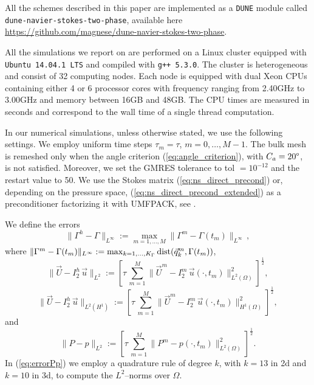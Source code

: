\documentclass[a4paper,12pt,onecolumn]{article}
\newcommand{\errorXx}{\|\Gamma^h - \Gamma\|_{L^\infty}}
\newcommand{\LerrorUu}[1]{\|\vec U - I^h_{#1}\,\vec u\|_{L^2}}
\newcommand{\HerrorUu}[1]{\|\vec U - I^h_{#1}\,\vec u\|_{L^2(H^1)}}
\newcommand{\LerrorPp}{\|P - p\|_{L^2}}
\newcommand{\myurl}[1]{\hfil\penalty 100 \hfilneg \hbox{\url{#1}}} %
\begin{document}
All the schemes described in this paper are implemented as a \verb|DUNE| module
called \verb|dune-navier-stokes-two-phase|, available here
\myurl{https://github.com/magnese/dune-navier-stokes-two-phase}.

All the simulations we report on are performed on a Linux cluster equipped with
\verb|Ubuntu 14.04.1 LTS| and compiled with \verb|g++ 5.3.0|. The cluster is
heterogeneous and consist of 32 computing nodes. Each node is equipped
with dual Xeon CPUs containing either 4 or 6 processor cores with frequency
ranging from 2.40GHz to 3.00GHz and memory between 16GB and 48GB. The CPU times
are measured in seconds and correspond to the wall time of a single thread
computation.

In our numerical simulations, unless otherwise stated, we use the following
settings. We employ uniform time steps $\tau_m=\tau$, $m=0,\ldots, M-1$. The
bulk mesh is remeshed only when the angle criterion (\ref{eq:angle_criterion}),
with $C_a=20\degree$, is not satisfied. Moreover, we set the GMRES
tolerance to tol $=10^{-12}$ and the restart value to 50. We use the Stokes
matrix (\ref{eq:ns_direct_precond}) or, depending on the pressure space,
(\ref{eq:ns_direct_precond_extended}) as a preconditioner factorizing it
with UMFPACK, see \cite{Davis04}.

We define the errors
\begin{equation} \label{eq:errorXx}
\errorXx := \max_{m=1,\ldots, M} \|\Gamma^m - \Gamma(t_m)\|_{L^\infty}\,,
\end{equation}
where $\|\Gamma^m - \Gamma(t_m)\|_{L^\infty} :=
\max_{k=1,\ldots, K_\Gamma} {\rm dist}( \vec q^m_k, \Gamma(t_m))$,
\begin{equation} \label{eq:errorLUu}
\LerrorUu2 := \left[\tau\,\sum_{m=1}^M \|\vec U^m - I^m_2\,\vec u(\cdot,
t_m)\|_{L^2(\Omega)}^2 \right]^\frac12,
\end{equation}
\begin{equation} \label{eq:errorHUu}
\HerrorUu2 := \left[\tau\,\sum_{m=1}^M \|\vec U^m - I^m_2\,\vec u(\cdot,
t_m)\|_{H^1(\Omega)}^2 \right]^\frac12,
\end{equation}
and
\begin{equation} \label{eq:errorPp}
\LerrorPp := \left[\tau\,\sum_{m=1}^M \|P^m - p(\cdot,t_m)\|_{L^2(\Omega)}^2
\right]^\frac12.
\end{equation}
In (\ref{eq:errorPp}) we employ a quadrature rule of degree $k$, with $k=13$ in
2d and $k=10$ in 3d, to compute the $L^2$--norms over $\Omega$.
\end{document}
